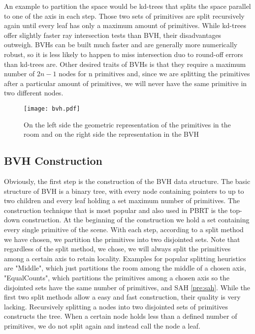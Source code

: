An example to partition the space would be kd-trees that splits the space parallel to one of the axis in each step. Those two sets of primitives are split recursively again until every leaf has only a maximum amount of primitives.  While kd-trees offer slightly faster ray intersection tests than BVH, their disadvantages outweigh. BVHs can be built much faster and are generally more numerically robust, so it is less likely to happen to miss intersection duo to round-off errors than kd-trees are. Other desired traits of BVHs is that they require a maximum number of $2n - 1$ nodes for n primitives and, since we are splitting the primitives after a particular amount of primitives, we will never have the same primitive in two different nodes.

\begin{figure}
	\begin{center}
		\texttt{[image: bvh.pdf]}
		\caption{On the left side the geometric representation of the primitives in the room and on the right side the representation in the BVH}
		\label{fig:bvh}
	\end{center}
\end{figure}


\subsection{BVH Construction}

Obviously, the first step is the construction of the BVH data structure. The basic structure of BVH is a binary tree, with every node containing pointers to up to two children and every leaf holding a set maximum number of primitives. The construction technique that is most popular and also used in PBRT is the top-down construction. At the beginning of the construction we hold a set containing every single primitive of the scene. With each step, according to a split method we have chosen, we partition the primitives into two disjointed sets. Note that regardless of the split method, we chose, we will always split the primitives among a certain axis to retain locality. Examples for popular splitting heuristics are "Middle", which just partitions the room among the middle of a chosen axis, "EqualCounts", which partitions the primitives among a chosen axis so the disjointed sets have the same number of primitives, and SAH \ref{pre:sah}. While the first two split methods allow a easy and fast construction, their quality is very lacking. Recursively splitting a nodes into two disjointed sets of primitives constructs the tree. When a certain node holds less than a defined number of primitives, we do not split again and instead call the node a leaf.

